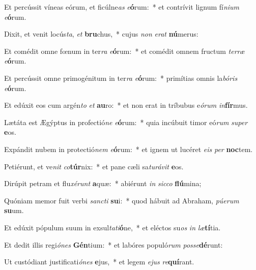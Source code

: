 \item Et percússit víneas eórum, et ficúlne\textit{as} \textit{e}\textbf{ó}rum:~* et contrívit lignum fí\textit{ni}\textit{um} \textit{e}\textbf{ó}rum.
\item Dixit, et venit locús\textit{ta}, \textit{et} \textbf{bru}chus,~* cujus \textit{non} \textit{e}\textit{rat} \textbf{nú}merus:
\item Et comédit omne fœnum in ter\textit{ra} \textit{e}\textbf{ó}rum:~* et comédit omnem fructum \textit{ter}\textit{ræ} \textit{e}\textbf{ó}rum.
\item Et percússit omne primogénitum in ter\textit{ra} \textit{e}\textbf{ó}rum:~* primítias omnis la\textit{bó}\textit{ris} \textit{e}\textbf{ó}rum.
\item Et edúxit eos cum argén\textit{to} \textit{et} \textbf{au}ro:~* et non erat in tríbubus e\textit{ó}\textit{rum} \textit{in}\textbf{fír}mus.
\item Lætáta est Ægýptus in profectió\textit{ne} \textit{e}\textbf{ó}rum:~* quia incúbuit timor eó\textit{rum} \textit{su}\textit{per} \textbf{e}os.
\item Expándit nubem in protectió\textit{nem} \textit{e}\textbf{ó}rum:~* et ignem ut lucéret \textit{e}\textit{is} \textit{per} \textbf{noc}tem.
\item Petiérunt, et ve\textit{nit} \textit{co}\textbf{túr}nix:~* et pane cæli sa\textit{tu}\textit{rá}\textit{vit} \textbf{e}os.
\item Dirúpit petram et flu\textit{xé}\textit{runt} \textbf{a}quæ:~* abiérunt \textit{in} \textit{sic}\textit{co} \textbf{flú}mina;
\item Quóniam memor fuit verbi \textit{sanc}\textit{ti} \textbf{su}i:~* quod hábuit ad Abraham, \textit{pú}\textit{e}\textit{rum} \textbf{su}um.
\item Et edúxit pópulum suum in exsul\textit{ta}\textit{ti}\textbf{ó}ne,~* et eléctos su\textit{os} \textit{in} \textit{læ}\textbf{tí}tia.
\item Et dedit illis regi\textit{ó}\textit{nes} \textbf{Gén}tium:~* et labóres populó\textit{rum} \textit{pos}\textit{se}\textbf{dé}runt:
\item Ut custódiant justificati\textit{ó}\textit{nes} \textbf{e}jus,~* et legem \textit{e}\textit{jus} \textit{re}\textbf{quí}rant.
